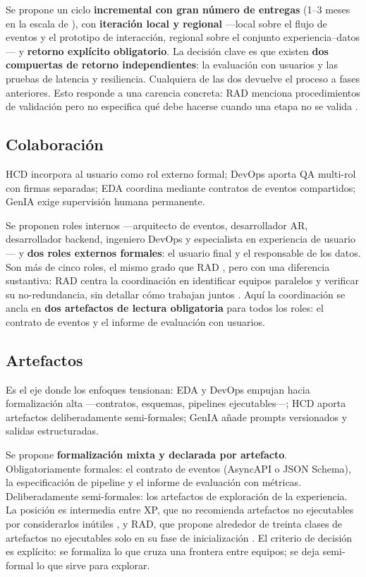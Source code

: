 \documentclass[conference]{IEEEtran}
\begin{document}
Se propone un ciclo \textbf{incremental con gran número de entregas} (1–3 meses en la escala de \cite{Ceret2013}), con \textbf{iteración local y regional} —local sobre el flujo de eventos y el prototipo de interacción, regional sobre el conjunto experiencia–datos— y \textbf{retorno explícito obligatorio}. La decisión clave es que existen \textbf{dos compuertas de retorno independientes}: la evaluación con usuarios y las pruebas de latencia y resiliencia. Cualquiera de las dos devuelve el proceso a fases anteriores. Esto responde a una carencia concreta: RAD menciona procedimientos de validación pero no especifica qué debe hacerse cuando una etapa no se valida \cite{Ceret2013}.

\subsection{Colaboración}

HCD incorpora al usuario como rol externo formal; DevOps aporta QA multi-rol con firmas separadas; EDA coordina mediante contratos de eventos compartidos; GenIA exige supervisión humana permanente.

Se proponen roles internos —arquitecto de eventos, desarrollador AR, desarrollador backend, ingeniero DevOps y especialista en experiencia de usuario— y \textbf{dos roles externos formales}: el usuario final y el responsable de los datos. Son más de cinco roles, el mismo grado que RAD \cite{Ceret2013}, pero con una diferencia sustantiva: RAD centra la coordinación en identificar equipos paralelos y verificar su no-redundancia, sin detallar cómo trabajan juntos \cite{Ceret2013}. Aquí la coordinación se ancla en \textbf{dos artefactos de lectura obligatoria} para todos los roles: el contrato de eventos y el informe de evaluación con usuarios.

\subsection{Artefactos}

Es el eje donde los enfoques tensionan: EDA y DevOps empujan hacia formalización alta —contratos, esquemas, pipelines ejecutables—; HCD aporta artefactos deliberadamente semi-formales; GenIA añade prompts versionados y salidas estructuradas.

Se propone \textbf{formalización mixta y declarada por artefacto}. Obligatoriamente formales: el contrato de eventos (AsyncAPI o JSON Schema), la especificación de pipeline y el informe de evaluación con métricas. Deliberadamente semi-formales: los artefactos de exploración de la experiencia. La posición es intermedia entre XP, que no recomienda artefactos no ejecutables por considerarlos inútiles \cite{Ceret2013}, y RAD, que propone alrededor de treinta clases de artefactos no ejecutables solo en su fase de inicialización \cite{Ceret2013}. El criterio de decisión es explícito: se formaliza lo que cruza una frontera entre equipos; se deja semi-formal lo que sirve para explorar.
\end{document}
